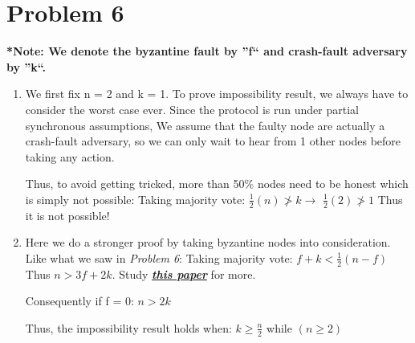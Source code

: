 \documentclass{article}
\begin{document}
\section*{Problem 6}
\textbf{*Note: We denote the byzantine fault by ''f`` and crash-fault adversary by ''k``.}
\begin{enumerate}
    \item %
    We first fix n = 2 and k = 1.
    To prove impossibility result, we always have to consider the worst case ever. Since the protocol is run under partial synchronous assumptions, We assume that the faulty node are actually a crash-fault adversary, so we can only wait to hear from 1 other nodes before taking any action.
    
    Thus, to avoid getting tricked, more than 50\% nodes need to be honest which is simply not possible:
    Taking majority vote: $ \frac{1}{2}(n) \ngtr k \longrightarrow$
    $ \frac{1}{2}(2) \ngtr 1 $ Thus it is not possible!
    \item %
    Here we do a stronger proof by taking byzantine nodes into consideration. Like what we saw in \emph{Problem 6}:
        Taking majority vote: $ f + k < \frac{1}{2}(n-f) $ Thus $ n > 3f + 2k$.
    Study \href{https://drops.dagstuhl.de/opus/volltexte/2022/17229/pdf/LIPIcs-DISC-2022-38.pdf}{\textbf{\emph{this paper}}} for more. 
    
    Consequently if f = 0: $n > 2k$
    
    Thus, the impossibility result holds when:
    $k \geq \frac{n}{2}$ while $(n\geq2)$
    
    
\end{enumerate}
\end{document}

